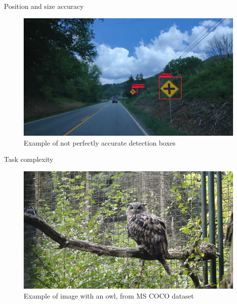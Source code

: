 \documentclass{beamer}
\begin{document}
\begin{frame}{Position and size accuracy}
    \begin{figure}
        \centering
        \includegraphics[width=0.8\linewidth]{figures/bad_box_example.png}
        \caption{Example of not perfectly accurate detection boxes}
    \end{figure}{}
\end{frame}{}

\begin{frame}{Task complexity}
    \begin{figure}
        \centering
        \includegraphics[width=0.8\linewidth]{figures/difficult_detection.jpg}
        \caption{Example of image with an owl, from MS COCO dataset \cite{mscoco}}
    \end{figure}{}
\end{frame}{}
\end{document}
